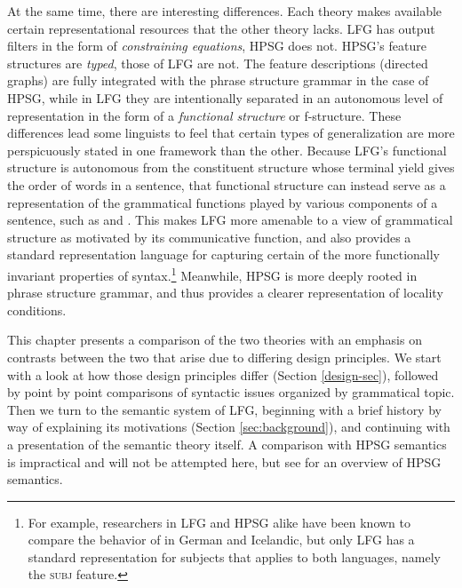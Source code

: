 At the same time, there are interesting differences.  Each theory makes available certain representational resources that the other theory lacks.   LFG has output filters in the form of \textit{constraining equations}, HPSG does not.  HPSG's feature structures are \textit{typed}, those of LFG are not.  The feature descriptions (directed graphs) are fully integrated with the phrase structure grammar in the case of HPSG, while in LFG they are intentionally separated in an autonomous level of representation in the form of a \textit{functional structure} or f-structure.  These differences lead some linguists to feel that certain types of generalization are more perspicuously stated in one framework than the other.   Because LFG's functional structure is autonomous from the constituent structure whose terminal yield gives the order of words in a sentence, that functional structure can instead serve as a representation of the grammatical functions  played by various components of a sentence, such as  and .  
This makes LFG more amenable to a view of grammatical structure as motivated by its communicative function, and also provides a standard representation language for capturing certain of the more functionally invariant properties of syntax.\footnote{For example, researchers in LFG and HPSG alike have been known to compare the behavior of  in German and Icelandic, but only LFG has a standard representation for subjects that applies to both languages, namely the \textsc{subj} feature.}
 Meanwhile, HPSG is more deeply rooted in phrase structure grammar, and thus provides a clearer representation of %
 locality conditions.

This chapter presents a comparison of the two theories with an emphasis on contrasts between the two that arise due to differing design principles.  We start with a look at how those design principles differ (Section \ref{design-sec}), followed by point by point comparisons of syntactic issues organized by grammatical topic.  Then we turn to the semantic system of LFG, beginning with a brief history by way of explaining its motivations (Section \ref{sec:background}), and continuing with a presentation of the semantic theory itself.  A comparison with HPSG semantics is impractical and will not be attempted here, but see   for an overview of HPSG semantics.  

